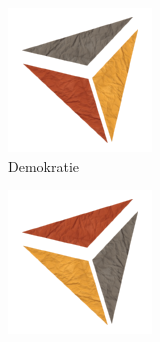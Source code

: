 \begin{figure}
    \centering
    \begin{subfigure}[t]{0.3\columnwidth}
        \includegraphics[width=\textwidth]{figures/i_demokratie}
        \caption{Demokratie}
        \label{fig:demo}
    \end{subfigure}
    \begin{subfigure}[t]{0.3\columnwidth}
        \includegraphics[width=\textwidth]{figures/i_macht}

\end{subfigure}
\end{figure}
